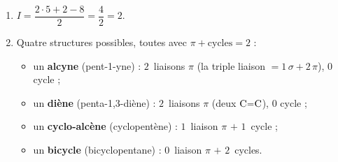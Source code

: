 \documentclass[11pt,a4paper]{article}
\begin{document}
\begin{corrige}[Que peut cacher $I=2$ ?]
\begin{enumerate}[label=\alph*)]
  \item $I=\dfrac{2\cdot5+2-8}{2}=\dfrac{4}{2}=2$.
  \item Quatre structures possibles, toutes avec $\pi+\text{cycles}=2$ :
  \begin{itemize}[leftmargin=1.6em,itemsep=1pt]
    \item un \textbf{alcyne} (pent-1-yne) : $2$~liaisons $\pi$ (la triple liaison $=1\,\sigma+2\,\pi$), $0$ cycle ;
    \item un \textbf{diène} (penta-1,3-diène) : $2$~liaisons $\pi$ (deux $\ce{C=C}$), $0$ cycle ;
    \item un \textbf{cyclo-alcène} (cyclopentène) : $1$~liaison $\pi$ $+$ $1$~cycle ;
    \item un \textbf{bicycle} (bicyclopentane) : $0$~liaison $\pi$ $+$ $2$~cycles.
  \end{itemize}
\end{enumerate}
\end{corrige}
\end{document}
